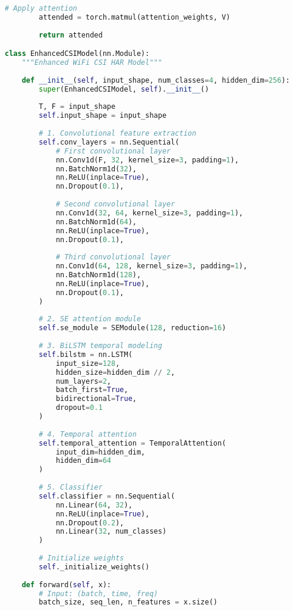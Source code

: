 \begin{lstlisting}[language=Python,caption=Complete Implementation of Enhanced Model]
        # Apply attention
        attended = torch.matmul(attention_weights, V)
        
        return attended

class EnhancedCSIModel(nn.Module):
    """Enhanced WiFi CSI HAR Model"""
    
    def __init__(self, input_shape, num_classes=4, hidden_dim=256):
        super(EnhancedCSIModel, self).__init__()
        
        T, F = input_shape
        self.input_shape = input_shape
        
        # 1. Convolutional feature extraction
        self.conv_layers = nn.Sequential(
            # First convolutional layer
            nn.Conv1d(F, 32, kernel_size=3, padding=1),
            nn.BatchNorm1d(32),
            nn.ReLU(inplace=True),
            nn.Dropout(0.1),
            
            # Second convolutional layer
            nn.Conv1d(32, 64, kernel_size=3, padding=1),
            nn.BatchNorm1d(64),
            nn.ReLU(inplace=True),
            nn.Dropout(0.1),
            
            # Third convolutional layer
            nn.Conv1d(64, 128, kernel_size=3, padding=1),
            nn.BatchNorm1d(128),
            nn.ReLU(inplace=True),
            nn.Dropout(0.1),
        )
        
        # 2. SE attention module
        self.se_module = SEModule(128, reduction=16)
        
        # 3. BiLSTM temporal modeling
        self.bilstm = nn.LSTM(
            input_size=128,
            hidden_size=hidden_dim // 2,
            num_layers=2,
            batch_first=True,
            bidirectional=True,
            dropout=0.1
        )
        
        # 4. Temporal attention
        self.temporal_attention = TemporalAttention(
            input_dim=hidden_dim,
            hidden_dim=64
        )
        
        # 5. Classifier
        self.classifier = nn.Sequential(
            nn.Linear(64, 32),
            nn.ReLU(inplace=True),
            nn.Dropout(0.2),
            nn.Linear(32, num_classes)
        )
        
        # Initialize weights
        self._initialize_weights()
    
    def forward(self, x):
        # Input: (batch, time, freq)
        batch_size, seq_len, n_features = x.size()
        

\end{lstlisting}

